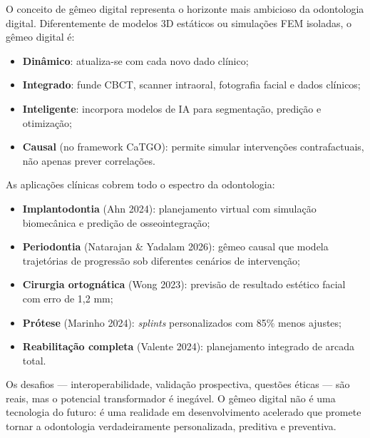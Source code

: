 O conceito de gêmeo digital representa o horizonte mais ambicioso da odontologia digital. Diferentemente de modelos 3D estáticos ou simulações FEM isoladas, o gêmeo digital é:
\begin{itemize}
    \item \textbf{Dinâmico}: atualiza-se com cada novo dado clínico;
    \item \textbf{Integrado}: funde CBCT, scanner intraoral, fotografia facial e dados clínicos;
    \item \textbf{Inteligente}: incorpora modelos de IA para segmentação, predição e otimização;
    \item \textbf{Causal} (no framework CaTGO): permite simular intervenções contrafactuais, não apenas prever correlações.
\end{itemize}

As aplicações clínicas cobrem todo o espectro da odontologia:
\begin{itemize}
    \item \textbf{Implantodontia} (Ahn 2024): planejamento virtual com simulação biomecânica e predição de osseointegração;
    \item \textbf{Periodontia} (Natarajan \& Yadalam 2026): gêmeo causal que modela trajetórias de progressão sob diferentes cenários de intervenção;
    \item \textbf{Cirurgia ortognática} (Wong 2023): previsão de resultado estético facial com erro de 1,2 mm;
    \item \textbf{Prótese} (Marinho 2024): \textit{splints} personalizados com 85\% menos ajustes;
    \item \textbf{Reabilitação completa} (Valente 2024): planejamento integrado de arcada total.
\end{itemize}

Os desafios --- interoperabilidade, validação prospectiva, questões éticas --- são reais, mas o potencial transformador é inegável. O gêmeo digital não é uma tecnologia do futuro: é uma realidade em desenvolvimento acelerado que promete tornar a odontologia verdadeiramente personalizada, preditiva e preventiva.

